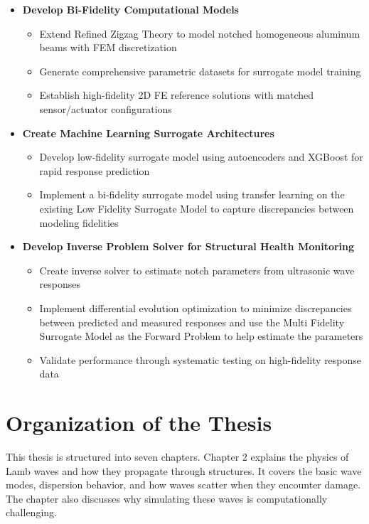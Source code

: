 \documentclass[12pt,a4paper]{report}
\begin{document}
\begin{itemize}
    \item \textbf{Develop Bi-Fidelity Computational Models}
    \begin{itemize}
        \item Extend Refined Zigzag Theory to model notched homogeneous aluminum beams with FEM discretization
        \item Generate comprehensive parametric datasets for surrogate model training
        \item Establish high-fidelity 2D FE reference solutions with matched sensor/actuator configurations
    \end{itemize}
    
    \item \textbf{Create Machine Learning Surrogate Architectures}
    \begin{itemize}
        \item Develop low-fidelity surrogate model using autoencoders and XGBoost for rapid response prediction
        \item Implement a bi-fidelity surrogate model using transfer learning on the existing Low Fidelity Surrogate Model to capture discrepancies between modeling fidelities
    \end{itemize}
    
    \item \textbf{Develop Inverse Problem Solver for Structural Health Monitoring}
    \begin{itemize}
        \item Create inverse solver to estimate notch parameters from ultrasonic wave responses
        \item Implement differential evolution optimization to minimize discrepancies between predicted and measured responses and use the Multi Fidelity Surrogate Model as the Forward Problem to help estimate the parameters
        \item Validate performance through systematic testing on high-fidelity response data
    \end{itemize}
\end{itemize}

\section{Organization of the Thesis}


This thesis is structured into seven chapters. Chapter 2 explains the physics of Lamb waves and how they propagate through structures. It covers the basic wave modes, dispersion behavior, and how waves scatter when they encounter damage. The chapter also discusses why simulating these waves is computationally challenging.
\end{document}
